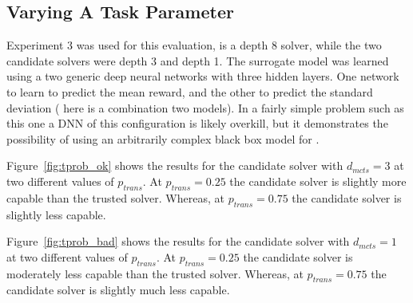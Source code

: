 \subsection{Varying A Task Parameter}
Experiment 3 was used for this evaluation, \solverstar{} is a depth 8 solver, while the two candidate solvers were depth 3 and depth 1. The surrogate model \surrogate{} was learned using a two generic deep neural networks  with three hidden layers. One network to learn to predict the mean reward, and the other to predict the standard deviation (\surrogate{} here is a combination two models). In a fairly simple problem such as this one a DNN of this configuration is likely overkill, but it demonstrates the possibility of using an arbitrarily complex black box model for \surrogate.

Figure~\ref{fig:tprob_ok} shows the results for the candidate solver with $d_{mcts}=3$ at two different values of $p_{trans}$. At $p_{trans}=0.25$ the candidate solver is slightly more capable than the trusted solver. Whereas, at $p_{trans}=0.75$ the candidate solver is slightly less capable.

Figure~\ref{fig:tprob_bad} shows the results for the candidate solver with $d_{mcts}=1$ at two different values of $p_{trans}$. At $p_{trans}=0.25$ the candidate solver is moderately less capable than the trusted solver. Whereas, at $p_{trans}=0.75$ the candidate solver is slightly much less capable.

